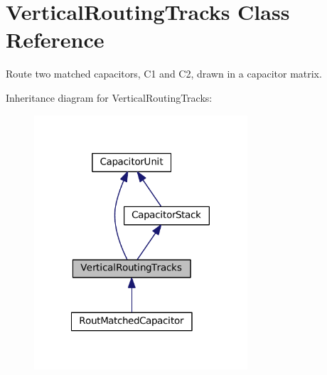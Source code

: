 \hypertarget{classpython_1_1capacitorvrtracks_1_1VerticalRoutingTracks}{}\section{Vertical\+Routing\+Tracks Class Reference}
\label{classpython_1_1capacitorvrtracks_1_1VerticalRoutingTracks}


Route two matched capacitors, C1 and C2, drawn in a capacitor matrix.  




Inheritance diagram for Vertical\+Routing\+Tracks\+:
\nopagebreak
\begin{figure}[H]
\begin{center}
\leavevmode
\includegraphics[width=225pt]{classpython_1_1capacitorvrtracks_1_1VerticalRoutingTracks__inherit__graph}
\end{center}
\end{figure}
